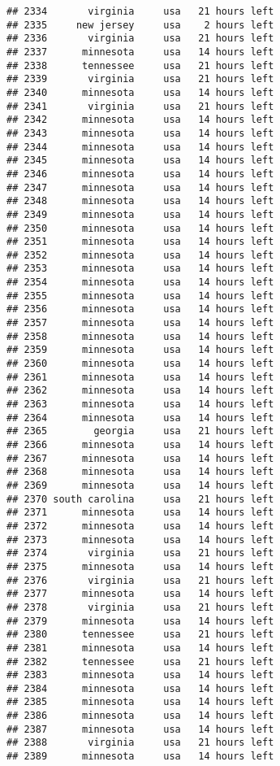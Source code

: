 \documentclass[
]{article}
\begin{document}
\begin{verbatim}
## 2334       virginia     usa   21 hours left
## 2335     new jersey     usa    2 hours left
## 2336       virginia     usa   21 hours left
## 2337      minnesota     usa   14 hours left
## 2338      tennessee     usa   21 hours left
## 2339       virginia     usa   21 hours left
## 2340      minnesota     usa   14 hours left
## 2341       virginia     usa   21 hours left
## 2342      minnesota     usa   14 hours left
## 2343      minnesota     usa   14 hours left
## 2344      minnesota     usa   14 hours left
## 2345      minnesota     usa   14 hours left
## 2346      minnesota     usa   14 hours left
## 2347      minnesota     usa   14 hours left
## 2348      minnesota     usa   14 hours left
## 2349      minnesota     usa   14 hours left
## 2350      minnesota     usa   14 hours left
## 2351      minnesota     usa   14 hours left
## 2352      minnesota     usa   14 hours left
## 2353      minnesota     usa   14 hours left
## 2354      minnesota     usa   14 hours left
## 2355      minnesota     usa   14 hours left
## 2356      minnesota     usa   14 hours left
## 2357      minnesota     usa   14 hours left
## 2358      minnesota     usa   14 hours left
## 2359      minnesota     usa   14 hours left
## 2360      minnesota     usa   14 hours left
## 2361      minnesota     usa   14 hours left
## 2362      minnesota     usa   14 hours left
## 2363      minnesota     usa   14 hours left
## 2364      minnesota     usa   14 hours left
## 2365        georgia     usa   21 hours left
## 2366      minnesota     usa   14 hours left
## 2367      minnesota     usa   14 hours left
## 2368      minnesota     usa   14 hours left
## 2369      minnesota     usa   14 hours left
## 2370 south carolina     usa   21 hours left
## 2371      minnesota     usa   14 hours left
## 2372      minnesota     usa   14 hours left
## 2373      minnesota     usa   14 hours left
## 2374       virginia     usa   21 hours left
## 2375      minnesota     usa   14 hours left
## 2376       virginia     usa   21 hours left
## 2377      minnesota     usa   14 hours left
## 2378       virginia     usa   21 hours left
## 2379      minnesota     usa   14 hours left
## 2380      tennessee     usa   21 hours left
## 2381      minnesota     usa   14 hours left
## 2382      tennessee     usa   21 hours left
## 2383      minnesota     usa   14 hours left
## 2384      minnesota     usa   14 hours left
## 2385      minnesota     usa   14 hours left
## 2386      minnesota     usa   14 hours left
## 2387      minnesota     usa   14 hours left
## 2388       virginia     usa   21 hours left
## 2389      minnesota     usa   14 hours left

\end{verbatim}
\end{document}
